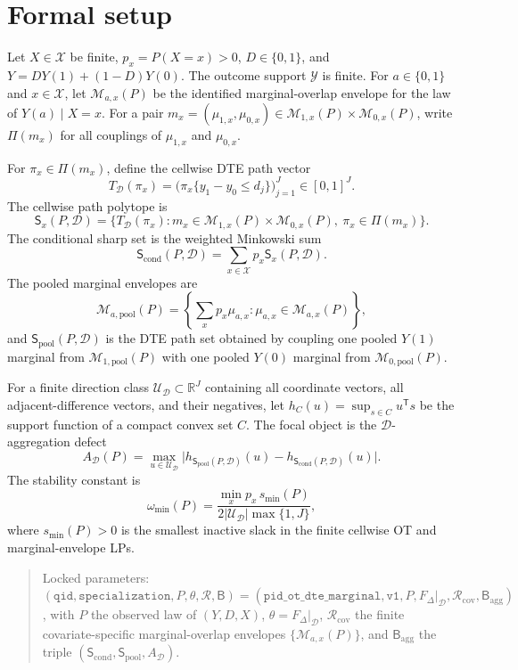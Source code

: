\documentclass[11pt]{article}
\newcommand{\transpose}{\mathsf{T}}
\newcommand{\R}{\mathbb{R}}
\theoremstyle{definition}
\theoremstyle{plain}
\theoremstyle{remark}
\begin{document}
\section{Formal setup}
Let \(X\in\mathcal X\) be finite, \(p_x=P(X=x)>0\), \(D\in\{0,1\}\), and \(Y=DY(1)+(1-D)Y(0)\).  The outcome support \(\mathcal Y\) is finite.  For \(a\in\{0,1\}\) and \(x\in\mathcal X\), let \(\mathcal M_{a,x}(P)\) be the identified marginal-overlap envelope for the law of \(Y(a)\mid X=x\).  For a pair \(m_x=(\mu_{1,x},\mu_{0,x})\in\mathcal M_{1,x}(P)\times\mathcal M_{0,x}(P)\), write \(\Pi(m_x)\) for all couplings of \(\mu_{1,x}\) and \(\mu_{0,x}\).

For \(\pi_x\in\Pi(m_x)\), define the cellwise DTE path vector
\[
T_{\mathcal D}(\pi_x)=
\bigl(\pi_x\{y_1-y_0\le d_j\}\bigr)_{j=1}^J\in[0,1]^J.
\]
The cellwise path polytope is
\[
\mathsf S_x(P,\mathcal D)=
\{T_{\mathcal D}(\pi_x):m_x\in\mathcal M_{1,x}(P)\times\mathcal M_{0,x}(P),\ \pi_x\in\Pi(m_x)\}.
\]
The conditional sharp set is the weighted Minkowski sum
\[
\mathsf S_{\mathrm{cond}}(P,\mathcal D)=
\sum_{x\in\mathcal X} p_x \mathsf S_x(P,\mathcal D).
\]
The pooled marginal envelopes are
\[
\mathcal M_{a,\mathrm{pool}}(P)=
\left\{\sum_x p_x\mu_{a,x}:\mu_{a,x}\in\mathcal M_{a,x}(P)\right\},
\]
and \(\mathsf S_{\mathrm{pool}}(P,\mathcal D)\) is the DTE path set obtained by coupling one pooled \(Y(1)\) marginal from \(\mathcal M_{1,\mathrm{pool}}(P)\) with one pooled \(Y(0)\) marginal from \(\mathcal M_{0,\mathrm{pool}}(P)\).

For a finite direction class \(\mathcal U_{\mathcal D}\subset\R^J\) containing all coordinate vectors, all adjacent-difference vectors, and their negatives, let \(h_C(u)=\sup_{s\in C}u^\transpose s\) be the support function of a compact convex set \(C\).  The focal object is the \(\mathcal D\)-aggregation defect
\[
A_{\mathcal D}(P)=
\max_{u\in\mathcal U_{\mathcal D}}
\bigl|h_{\mathsf S_{\mathrm{pool}}(P,\mathcal D)}(u)-
h_{\mathsf S_{\mathrm{cond}}(P,\mathcal D)}(u)\bigr|.
\]
The stability constant is
\[
\omega_{\min}(P)=
\frac{\min_x p_x\,s_{\min}(P)}{2|\mathcal U_{\mathcal D}|\max\{1,J\}},
\]
where \(s_{\min}(P)>0\) is the smallest inactive slack in the finite cellwise OT and marginal-envelope LPs.

\begin{quote}
Locked parameters: \((\texttt{qid},\texttt{specialization},P,\theta,\mathcal R,\mathsf B)
=
(\texttt{pid\_ot\_dte\_marginal},\texttt{v1},P,F_\Delta|_{\mathcal D},
\mathcal R_{\mathrm{cov}},\mathsf B_{\mathrm{agg}})\), with \(P\) the observed law of \((Y,D,X)\), \(\theta=F_\Delta|_{\mathcal D}\), \(\mathcal R_{\mathrm{cov}}\) the finite covariate-specific marginal-overlap envelopes \(\{\mathcal M_{a,x}(P)\}\), and \(\mathsf B_{\mathrm{agg}}\) the triple \((\mathsf S_{\mathrm{cond}},\mathsf S_{\mathrm{pool}},A_{\mathcal D})\).
\end{quote}
\end{document}
